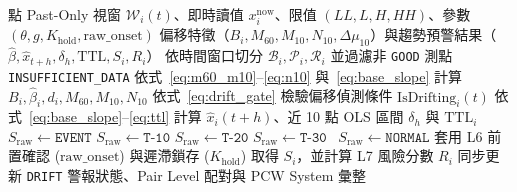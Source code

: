 \documentclass[fontset=none, a4paper, 12pt]{ctexart}
\begin{document}
\begin{doublespace}
\begin{algorithm}[H]
\caption{統一偏移偵測與趨勢預測七層工業硬化演算法 (Unified V1)}
\label{alg:unified_v1}
\begin{algorithmic}[1]
 點 Past-Only 視窗 $\mathcal{W}_i(t)$、即時讀值 $x_i^{\mathrm{now}}$、限值 $(LL, L, H, HH)$、參數 $(\theta, g, K_{\mathrm{hold}}, \text{raw\_onset})$
\Ensure 偏移特徵（$B_i, M_{60}, M_{10}, N_{10}, \Delta\mu_{10}$）與趨勢預警結果（$\hat{\beta}, \hat{x}_{t+h}, \delta_h, \mathrm{TTL}, S_i, R_i$）
\State 依時間窗口切分 $\mathcal{B}_i, \mathcal{P}_i, \mathcal{R}_i$ 並過濾非 \texttt{GOOD} 測點
    \State \Return \texttt{INSUFFICIENT\_DATA} 
\EndIf
\State 依式~\eqref{eq:m60_m10}--\eqref{eq:n10} 與~\eqref{eq:base_slope} 計算 $B_i, \hat{\beta}_i, d_i, M_{60}, M_{10}, N_{10}$
\State 依式~\eqref{eq:drift_gate} 檢驗偏移偵測條件 $\mathrm{IsDrifting}_i(t)$ 
\State 依式~\eqref{eq:base_slope}--\eqref{eq:ttl} 計算 $\hat{x}_i(t+h)$、近 10 點 OLS 區間 $\delta_h$ 與 $\mathrm{TTL}_i$ 
    \State $S_{\mathrm{raw}} \leftarrow \texttt{EVENT}$ 
 $S_{\mathrm{raw}} \leftarrow \texttt{T-10}$
 $S_{\mathrm{raw}} \leftarrow \texttt{T-20}$
 $S_{\mathrm{raw}} \leftarrow \texttt{T-30}$
\Else\ $S_{\mathrm{raw}} \leftarrow \texttt{NORMAL}$
\EndIf
\State 套用 L6 前置確認 ($\text{raw\_onset}$) 與遲滯鎖存 ($K_{\mathrm{hold}}$) 取得 $S_i$，並計算 L7 風險分數 $R_i$
\State 同步更新 \texttt{DRIFT} 警報狀態、Pair Level 配對與 PCW System 彙整
\end{algorithmic}
\end{algorithm}


\end{doublespace}
\end{document}
